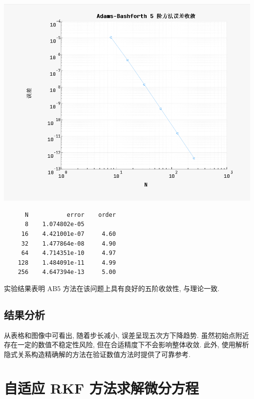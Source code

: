 \documentclass[12pt]{article}
\begin{document}
			\begin{center}
				\begin{minipage}{0.45\textwidth}
					\includegraphics[width=\textwidth]{figure/ab5.png}
				\end{minipage}
				  \hspace{0.05\textwidth}
				\begin{minipage}{0.45\textwidth}
				\begin{verbatim}
	  N           error    order
	  8    1.074802e-05
	 16    4.421001e-07     4.60
	 32    1.477864e-08     4.90
	 64    4.714351e-10     4.97
	128    1.484091e-11     4.99
	256    4.647394e-13     5.00
				\end{verbatim}
				\end{minipage}
			\end{center}

			实验结果表明 AB5 方法在该问题上具有良好的五阶收敛性, 与理论一致.

		\subsection{结果分析}
			从表格和图像中可看出, 随着步长减小, 误差呈现五次方下降趋势. 虽然初始点附近存在一定的数值不稳定性风险, 但在合适精度下不会影响整体收敛. 此外, 使用解析隐式关系构造精确解的方法在验证数值方法时提供了可靠参考.

	\newpage

	\section{自适应 RKF 方法求解微分方程}
\end{document}
